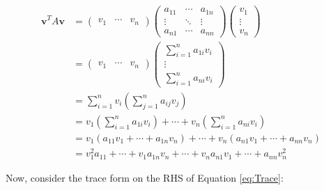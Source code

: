 \documentclass[12pt,a4paper]{article}
\begin{document}
\begin{align*}
\mathbf{v}^T A \mathbf{v} &= \begin{pmatrix} v_1 & \cdots & v_n \end{pmatrix} \begin{pmatrix} a_{11} & \cdots & a_{1n} \\
\vdots & \ddots & \vdots \\
a_{n1} & \cdots & a_{nn} \end{pmatrix} \begin{pmatrix} v_1 \\ \vdots \\ v_n \end{pmatrix} \\
&= \begin{pmatrix} v_1 & \cdots & v_n \end{pmatrix} \begin{pmatrix} \sum_{i=1}^{n} a_{1i} v_i  \\ \vdots \\ \sum_{i=1}^{n} a_{ni} v_i \end{pmatrix} \\
&= \sum_{i=1}^{n} v_i \left( \sum_{j=1}^{n} a_{ij} v_j \right) \\
&= v_1 \left( \sum_{i=1}^{n} a_{1i} v_i \right) + \cdots + v_n \left( \sum_{i=1}^{n} a_{ni} v_i \right) \\
&= v_1 \left( a_{11}  v_1 + \cdots + a_{1n}  v_n \right) + \cdots + v_n \left( a_{n1}  v_1 + \cdots + a_{nn}  v_n \right) \\
&= v_1^2 a_{11} + \cdots + v_1 a_{1n}  v_n  + \cdots + v_n a_{n1}  v_1 + \cdots + a_{nn}  v_n^2
\end{align*}

Now, consider the trace form on the RHS of Equation \eqref{eq:Trace}:
\end{document}
